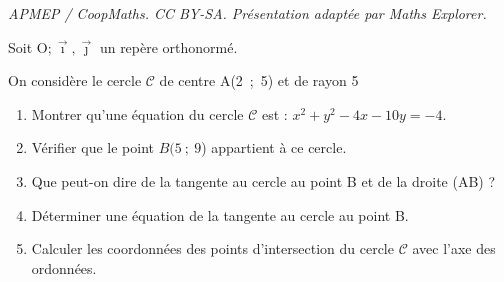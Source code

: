 \documentclass[10pt]{article}
\providecommand{\Oij}{\(\mathrm{O};\vec{\imath},\vec{\jmath}\)}
\begin{document}
\noindent\textit{APMEP / CoopMaths. CC BY-SA. Présentation adaptée par Maths Explorer.}\par\medskip
\medskip


Soit \Oij{} un repère orthonormé.

On considère le cercle $\mathcal{C}$ de centre A(2~;~5) et de rayon 5

\medskip

\begin{enumerate}
\item Montrer qu'une équation du cercle $\mathcal{C}$ est : $x^2 + y^2 - 4x - 10y= -4$.
\item Vérifier que le point $B(5~;~9$) appartient à ce cercle.
\item Que peut-on dire de la tangente au cercle au point B et de la droite (AB) ?
\item Déterminer une équation de la tangente au cercle au point B.
\item Calculer les coordonnées des points d'intersection du cercle $\mathcal{C}$ avec l'axe des ordonnées.
\end{enumerate}

\vspace{0,5cm}
\end{document}
